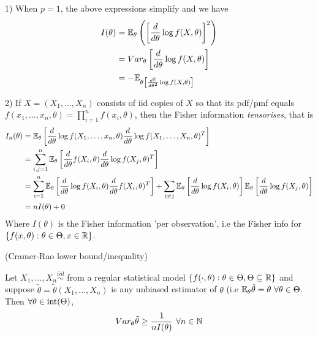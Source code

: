 \documentclass[a4paper]{article}
\begin{document}
\begin{remark}
\item[1)] When $p=1$, the above expressions simplify and we have
	\begin{align*}
		I(\theta) &= \mathbb{E}_{\theta} \left( \left[ \frac{d}{d \theta} \log f(X, \theta) \right]^2  \right)  \\
		&= Var_{\theta} \left[ \frac{d}{d \theta} \log f(X, \theta) \right]  \\
		&= -\mathbb{E}_{\theta \left[ \frac{d^2}{d \theta^2} \log f(X, \theta) \right] }
	\end{align*}

\item[2)] If $X = (X_1, \ldots, X_n)$ consists of iid copies of $X$ so that its pdf/pmf equals $f(x_1, \ldots, x_n, \theta) = \prod_{i=1}^{n} f(x_i, \theta)$, then the Fisher information \textit{tensorises}, that is 
	\begin{align*}
		I_n(\theta) &= \mathbb{E}_{\theta}\left[ \frac{d}{d \theta} \log f(X_1, \ldots, x_n, \theta) \frac{d}{d\theta} \log f(X_1, \ldots, X_n, \theta)^{T} \right] \\
		&= \sum_{i,j = 1}^{ n} \mathbb{E}_{\theta} \left[ \frac{d}{d \theta} f(X_{i}, \theta) \frac{d}{d \theta} \log f(X_j, \theta)^{T} \right]  \\
		&= \sum_{i=1}^{n} \mathbb{E}_{\theta} \left[ \frac{d}{d \theta} \log f(X_i, \theta) \frac{d}{d\theta} f(X_i, \theta)^{T} \right] + \sum_{i\neq j} \mathbb{E}_{\theta} \left[ \frac{d}{d\theta} \log f(X_i, \theta) \right] \mathbb{E}_{\theta}\left[ \frac{d}{d\theta} \log f(X_j, \theta) \right]  \\
		&= nI(\theta) + 0
	\end{align*}
	Where $I(\theta)$ is the Fisher information 'per observation', i.e the Fisher info for $\{f(x, \theta) : \theta \in \Theta, x \in \mathbb{R}\} $.
\end{remark}

\newpage

\begin{prop}
	(Cramer-Rao lower bound/inequality)

	Let $X_1, \ldots, X_n \stackrel{iid}{\sim}$ from a regular statistical model $\{f(\cdot , \theta) : \theta \in \Theta, \Theta \subseteq \mathbb{R}\}$ and suppose $\tilde{\theta} = \tilde{\theta}(X_1, \ldots, X_n)$ is any unbiased estimator of $\theta$ (i.e $\mathbb{E}_{\theta} \tilde{\theta} = \theta \text{ } \forall \theta \in \Theta$. Then $\forall \theta \in \operatorname{int}(\Theta)$,
	\[
		Var_{\theta} \tilde{\theta} \ge \frac{1}{nI(\theta)} \text{ } \forall n \in  \mathbb{N}
	\] 
\end{prop}
\end{document}
